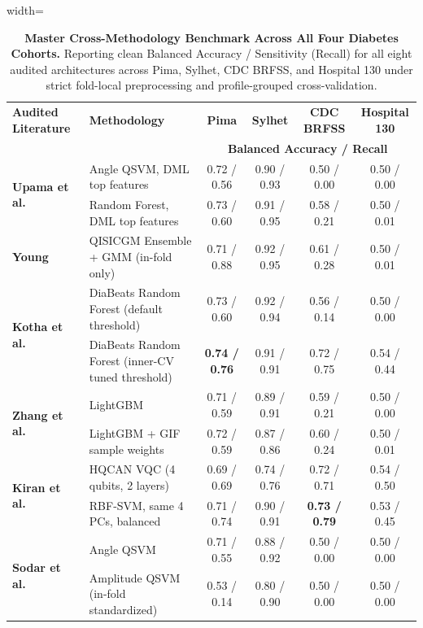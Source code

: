 \documentclass[journal,twocolumn]{IEEEtran}
\begin{document}
\begin{table}[htbp]
\centering\footnotesize
\caption{\textbf{Master Cross-Methodology Benchmark Across All Four Diabetes Cohorts.} Reporting clean Balanced Accuracy / Sensitivity (Recall) for all eight audited architectures across Pima, Sylhet, CDC BRFSS, and Hospital 130 under strict fold-local preprocessing and profile-grouped cross-validation.}
\label{tab:cross_methodology_master}
\begin{adjustbox}{width=\textwidth}
\begin{tabular}{llcccc}
\toprule 
\textbf{Audited Literature} & \textbf{Methodology} & \textbf{Pima} & \textbf{Sylhet} & \textbf{CDC BRFSS} & \textbf{Hospital 130} \\
& & \multicolumn{4}{c}{\textbf{Balanced Accuracy / Recall}} \\
\midrule
\multirow{2}{*}{\textbf{Upama et al.}~\cite{upama2026}} 
& Angle QSVM, DML top features & 0.72 / 0.56 & 0.90 / 0.93 & 0.50 / 0.00 & 0.50 / 0.00 \\
& Random Forest, DML top features & 0.73 / 0.60 & 0.91 / 0.95 & 0.58 / 0.21 & 0.50 / 0.01 \\
\midrule
\textbf{Young}~\cite{young2025} 
& QISICGM Ensemble + GMM (in-fold only) & 0.71 / 0.88 & 0.92 / 0.95 & 0.61 / 0.28 & 0.50 / 0.01 \\
\midrule
\multirow{2}{*}{\textbf{Kotha et al.}~\cite{kotha2026}} 
& DiaBeats Random Forest (default threshold) & 0.73 / 0.60 & 0.92 / 0.94 & 0.56 / 0.14 & 0.50 / 0.00 \\
& DiaBeats Random Forest (inner-CV tuned threshold) & \textbf{0.74 / 0.76} & 0.91 / 0.91 & 0.72 / 0.75 & 0.54 / 0.44 \\
\midrule
\multirow{2}{*}{\textbf{Zhang et al.}~\cite{zhang2025}} 
& LightGBM & 0.71 / 0.59 & 0.89 / 0.91 & 0.59 / 0.21 & 0.50 / 0.00 \\
& LightGBM + GIF sample weights & 0.72 / 0.59 & 0.87 / 0.86 & 0.60 / 0.24 & 0.50 / 0.01 \\
\midrule
\multirow{2}{*}{\textbf{Kiran et al.}~\cite{kiran2025}} 
& HQCAN VQC (4 qubits, 2 layers) & 0.69 / 0.69 & 0.74 / 0.76 & 0.72 / 0.71 & 0.54 / 0.50 \\
& RBF-SVM, same 4 PCs, balanced & 0.71 / 0.74 & 0.90 / 0.91 & \textbf{0.73 / 0.79} & 0.53 / 0.45 \\
\midrule
\multirow{2}{*}{\textbf{Sodar et al.}~\cite{sodar2026}} 
& Angle QSVM & 0.71 / 0.55 & 0.88 / 0.92 & 0.50 / 0.00 & 0.50 / 0.00 \\
& Amplitude QSVM (in-fold standardized) & 0.53 / 0.14 & 0.80 / 0.90 & 0.50 / 0.00 & 0.50 / 0.00 \\

\end{tabular}
\end{adjustbox}
\end{table}
\end{document}
